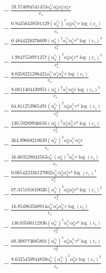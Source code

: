 \documentclass[10pt]{article}
\begin{document}
\begin{align*}
&{}  - \frac{59.574094541453 \alpha_{0}^{c_s} \alpha_{0}^s \alpha_{1}^s \alpha_{3}^s r}{c_{s}} \\
&{}  - \frac{0.94350439591129 \left(\alpha_{0}^{c_s}\right)^{5} \alpha_{0}^s \alpha_{1}^{c_s} r \log{\left(c_{s} \right)}}{c_{s}} \\
&{}  - \frac{0.4844226376609 \left(\alpha_{0}^s\right)^{2} \alpha_{1}^{c_s} \alpha_{1}^s r^{3} \log{\left(c_{s} \right)}^{4}}{c_{s}^{3}} \\
&{}  - \frac{1.9847558971257 \left(\alpha_{0}^{c_s}\right)^{2} \alpha_{0}^s \alpha_{1}^s r^{4} \log{\left(c_{s} \right)}^{3}}{c_{s}^{4}} \\
&{}  - \frac{8.0358221286421 \alpha_{1}^{c_s} \alpha_{1}^s \alpha_{3}^{c_s} r \log{\left(c_{s} \right)}}{c_{s}} \\
&{}  - \frac{8.0811404420951 \left(\alpha_{0}^s\right)^{3} \alpha_{1}^{c_s} \alpha_{2}^s r \log{\left(c_{s} \right)}^{3}}{c_{s}} \\
&{}  - \frac{64.811253965491 \left(\alpha_{0}^{c_s}\right)^{2} \alpha_{0}^s \alpha_{1}^{c_s} r^{4} \log{\left(c_{s} \right)}}{c_{s}^{4}} \\
&{}  - \frac{130.59289946616 \left(\alpha_{0}^s\right)^{2} \alpha_{1}^s \alpha_{2}^{c_s} r^{2} \log{\left(c_{s} \right)}}{c_{s}^{2}} \\
&{}  - \frac{264.99668219639 \left(\alpha_{0}^{c_s}\right)^{3} \alpha_{0}^s \alpha_{1}^{c_s} \alpha_{1}^s r}{c_{s}} \\
&{}  - \frac{16.603528043563 \alpha_{0}^{c_s} \left(\alpha_{0}^s\right)^{3} \alpha_{3}^{c_s} r \log{\left(c_{s} \right)}}{c_{s}} \\
&{}  - \frac{0.065422336127002 \alpha_{0}^{c_s} \alpha_{0}^s \alpha_{2}^s r^{4} \log{\left(c_{s} \right)}^{4}}{c_{s}^{4}} \\
&{}  - \frac{67.315181610026 \left(\alpha_{0}^{c_s}\right)^{3} \alpha_{0}^s \alpha_{2}^s r^{2} \log{\left(c_{s} \right)}^{2}}{c_{s}^{2}} \\
&{}  - \frac{16.854963568914 \alpha_{0}^{c_s} \alpha_{2}^s \alpha_{3}^{c_s} r \log{\left(c_{s} \right)}}{c_{s}} \\
&{}  - \frac{136.03500112836 \left(\alpha_{0}^{c_s}\right)^{2} \alpha_{1}^{c_s} \alpha_{2}^s r^{2} \log{\left(c_{s} \right)}}{c_{s}^{2}} \\
&{}  - \frac{68.308773685801 \left(\alpha_{0}^{c_s}\right)^{4} \alpha_{0}^s \alpha_{1}^{c_s} r^{2} \log{\left(c_{s} \right)}}{c_{s}^{2}} \\
&{}  - \frac{8.6325450944859 \alpha_{0}^{c_s} \left(\alpha_{1}^{c_s}\right)^{2} \alpha_{2}^s r \log{\left(c_{s} \right)}^{2}}{c_{s}} \\

\end{align*}
\end{document}
